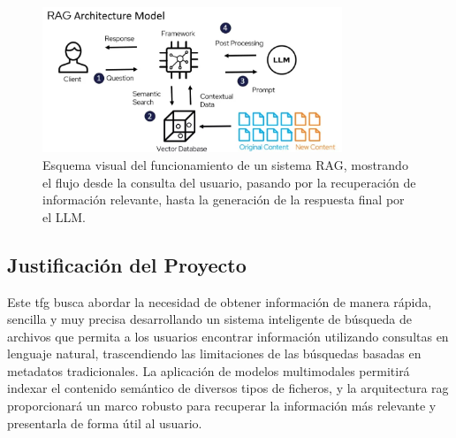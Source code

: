 \bigskip %
\begin{figure}[H] %
    \centering %
    \includegraphics[width=0.8\textwidth]{archivos/RAG_scheme.png} %
    \caption{Esquema visual del funcionamiento de un sistema RAG, mostrando el flujo desde la consulta del usuario, pasando por la recuperación de información relevante, hasta la generación de la respuesta final por el LLM.}
    \label{fig:rag_scheme} %
\end{figure}
\bigskip %

\subsection{Justificación del Proyecto}
Este \gls{tfg} busca abordar la necesidad de obtener información de manera rápida, sencilla y muy precisa desarrollando un sistema inteligente de búsqueda de archivos que permita a los usuarios encontrar información utilizando consultas en lenguaje natural, trascendiendo las limitaciones de las búsquedas basadas en metadatos tradicionales. La aplicación de modelos multimodales permitirá indexar el contenido semántico de diversos tipos de ficheros, y la arquitectura \gls{rag} proporcionará un marco robusto para recuperar la información más relevante y presentarla de forma útil al usuario.